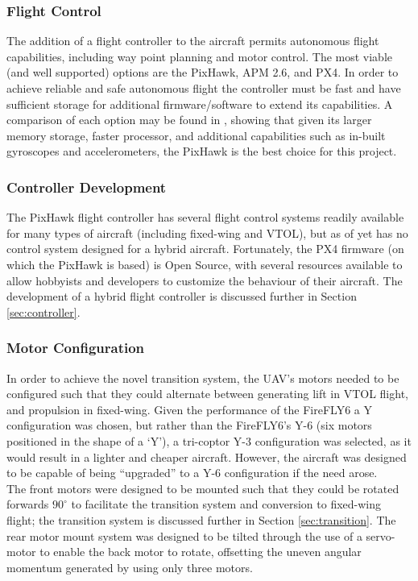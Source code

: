 \subsubsection*{Flight Control}
The addition of a flight controller to the aircraft permits autonomous flight capabilities, including way point planning and motor control. The most viable (and well supported) options are the PixHawk\cite{ref:pixhawk}, APM 2.6\cite{ref:ardupilot}, and PX4\cite{ref:px4}. In order to achieve reliable and safe autonomous flight the controller must be fast and have sufficient storage for additional firmware/software to extend its capabilities. A comparison of each option may be found in \cite{ref:controller_comparison}, showing that given its larger memory storage, faster processor, and additional capabilities such as in-built gyroscopes and accelerometers, the PixHawk is the best choice for this project.

\subsubsection*{Controller Development}
The PixHawk flight controller has several flight control systems readily available for many types of aircraft (including fixed-wing and VTOL), but as of yet has no control system designed for a hybrid aircraft. Fortunately, the PX4 firmware (on which the PixHawk is based) is Open Source\cite{ref:ardupilotgit}, with several resources available\cite{ref:firmware1,ref:firmware2} to allow hobbyists and developers to customize the behaviour of their aircraft. The development of a hybrid flight controller is discussed further in Section \ref{sec:controller}.

\subsubsection*{Motor Configuration}
In order to achieve the novel transition system, the UAV's motors needed to be configured such that they could alternate between generating lift in VTOL flight, and propulsion in fixed-wing. Given the performance of the FireFLY6 a Y configuration was chosen, but rather than the FireFLY6's Y-6 (six motors positioned in the shape of a `Y'), a tri-coptor Y-3 configuration  was selected, as it would result in a lighter and cheaper aircraft. However, the aircraft was designed to be capable of being ``upgraded'' to a Y-6 configuration if the need arose.\\

The front motors were designed to be mounted such that they could be rotated forwards $90^{\circ}$ to facilitate the transition system and conversion to fixed-wing flight; the transition system is discussed further in Section \ref{sec:transition}. The rear motor mount system was designed to be tilted through the use of a servo-motor to enable the back motor to rotate, offsetting the uneven angular momentum generated by using only three motors.
		
